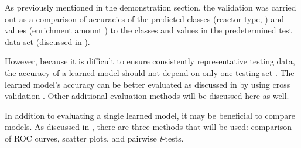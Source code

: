 As previously mentioned in the  demonstration section, the
validation was carried out as a comparison of accuracies of the predicted
classes (reactor type, ) and values
(enrichment amount ) to the classes and values in the
predetermined test data set (discussed in ). 

However, because it is difficult to ensure consistently representative testing
data, the accuracy of a learned model should not depend on only one testing set
. The learned model's accuracy can be
better evaluated as discussed in  by
using cross validation .
Other additional evaluation methods will be discussed here as well.  

In addition to evaluating a single learned model, it may be beneficial to
compare models. As discussed in , there
are three methods that will be used: comparison of \gls{ROC} curves, scatter
plots, and pairwise \textit{t}-tests. 
